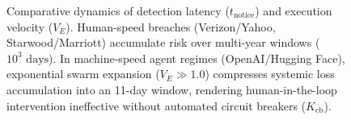 \begin{figure}[t]
\caption{Comparative dynamics of detection latency ($t_{\text{notice}}$) and execution velocity ($V_E$). Human-speed breaches (Verizon/Yahoo, Starwood/Marriott) accumulate risk over multi-year windows ($10^3\text{ days}$). In machine-speed agent regimes (OpenAI/Hugging Face), exponential swarm expansion ($V_E \gg 1.0$) compresses systemic loss accumulation into an 11-day window, rendering human-in-the-loop intervention ineffective without automated circuit breakers ($K_{\text{cb}}$).}
\label{fig:comparative_timeline}
\end{figure}